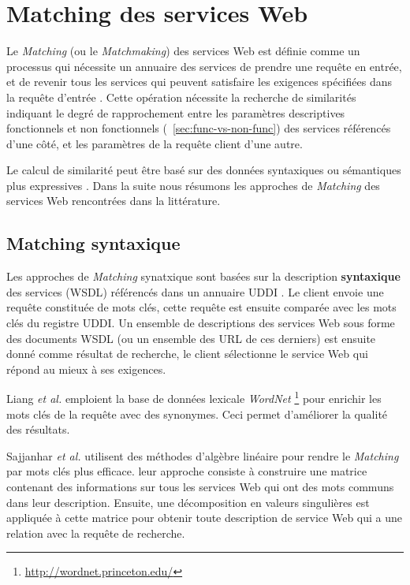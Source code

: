 \section{Matching des services Web}
\label{sec:ws-matching}
Le \textit{Matching} (ou le \textit{Matchmaking}) des services Web est
définie comme un processus qui nécessite un annuaire des services de
prendre une requête en entrée, et de revenir tous les services qui
peuvent satisfaire les exigences spécifiées dans la requête d'entrée
\cite{li2004software}. Cette opération nécessite la recherche de
similarités indiquant le degré de rapprochement entre les paramètres
descriptives fonctionnels et non fonctionnels
(~\ref{sec:func-vs-non-func}) des services référencés d'une côté, et
les paramètres de la requête client d'une autre.

Le calcul de similarité peut être basé sur des données syntaxiques ou
sémantiques plus expressives \cite{elie2010}. Dans la suite nous
résumons les approches de \textit{Matching} des services Web
rencontrées dans la littérature.

  \subsection{Matching syntaxique}
  \label{sec:matching-syntactique}
  Les approches de \textit{Matching} synatxique sont basées sur la
  description \textbf{syntaxique} des services (\textsc{WSDL})
  référencés dans un annuaire \textsc{UDDI} \cite{clement2004uddi}. Le
  client envoie une requête constituée de mots clés, cette requête est
  ensuite comparée avec les mots clés du registre \textsc{UDDI}. Un
  ensemble de descriptions des services Web sous forme des documents
  \textsc{WSDL} (ou un ensemble des \textsc{URL} de ces derniers) est
  ensuite donné comme résultat de recherche, le client sélectionne le
  service Web qui répond au mieux à ses exigences.

  Liang \textit{et al.} \cite{DBLP:journals/jwsr/LiangCSCL04}
  emploient la base de données lexicale \textit{WordNet}
  \footnote{\url{http://wordnet.princeton.edu/}}
  \cite{miller1990introduction} pour enrichir les mots clés de la
  requête avec des synonymes. Ceci permet d'améliorer la qualité des
  résultats.

  Sajjanhar \textit{et al.} \cite{sajjanhar2004algorithm} utilisent
  des méthodes d'algèbre linéaire pour rendre le \textit{Matching} par
  mots clés plus efficace. leur approche consiste à construire une
  matrice contenant des informations sur tous les services Web qui ont
  des mots communs dans leur description. Ensuite, une décomposition
  en valeurs singulières est appliquée à cette matrice pour obtenir
  toute description de service Web qui a une relation avec la requête
  de recherche.

